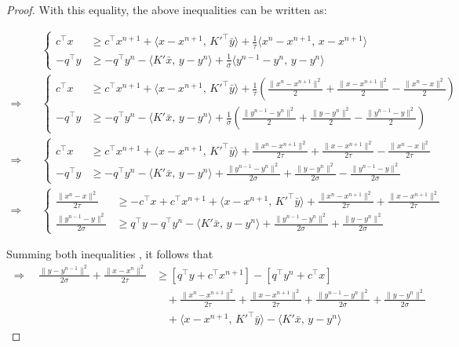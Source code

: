 \documentclass[10pt,a4paper]{amsart}
\begin{document}
\begin{proof}
    With this equality, the above inequalities can be written as:

\begin{align*}
&\left\{
\begin{aligned}
c^\top x &\geq c^\top x^{n+1} + \langle x - x^{n+1},\, K'^\top \bar{y} \rangle + \frac{1}{\tau} \langle x^n - x^{n+1},\, x - x^{n+1} \rangle \\
-q^\top y &\geq -q^\top y^{n} - \langle K' \bar{x},\, y - y^{n} \rangle + \frac{1}{\sigma} \langle y^{n-1} - y^{n},\, y - y^{n} \rangle
\end{aligned}
\right. \\[2ex]
%
\Rightarrow\quad
&\left\{
\begin{aligned}
c^\top x &\geq c^\top x^{n+1} + \langle x - x^{n+1},\, K'^\top \bar{y} \rangle 
+ \frac{1}{\tau} \left( \frac{\|x^n - x^{n+1}\|^2}{2} + \frac{\|x - x^{n+1}\|^2}{2} - \frac{\|x^n - x\|^2}{2} \right) \\
-q^\top y &\geq -q^\top y^{n} - \langle K' \bar{x},\, y - y^{n} \rangle 
+ \frac{1}{\sigma} \left( \frac{\|y^{n-1} - y^{n}\|^2}{2} + \frac{\|y - y^{n}\|^2}{2} - \frac{\|y^{n-1} - y\|^2}{2} \right)
\end{aligned}
\right. \\[2ex]
%
\Rightarrow\quad
&\left\{
\begin{aligned}
c^\top x &\geq c^\top x^{n+1} + \langle x - x^{n+1},\, K'^\top \bar{y} \rangle 
+ \frac{\|x^n - x^{n+1}\|^2}{2\tau} + \frac{\|x - x^{n+1}\|^2}{2\tau} - \frac{\|x^n - x\|^2}{2\tau} \\
-q^\top y &\geq -q^\top y^{n} - \langle K' \bar{x},\, y - y^{n} \rangle 
+ \frac{\|y^{n-1} - y^{n}\|^2}{2\sigma} + \frac{\|y - y^{n}\|^2}{2\sigma} - \frac{\|y^{n-1} - y\|^2}{2\sigma}
\end{aligned}
\right. \\[2ex]
%
\Rightarrow\quad
&\left\{
\begin{aligned}
\frac{\|x^n - x\|^2}{2\tau} &\geq -c^\top x + c^\top x^{n+1} + \langle x - x^{n+1},\, K'^\top \bar{y} \rangle 
+ \frac{\|x^n - x^{n+1}\|^2}{2\tau} + \frac{\|x - x^{n+1}\|^2}{2\tau} \\
\frac{\|y^{n-1} - y\|^2}{2\sigma} &\geq q^\top y - q^\top y^{n} - \langle K' \bar{x},\, y - y^{n} \rangle 
+ \frac{\|y^{n-1} - y^{n}\|^2}{2\sigma} + \frac{\|y - y^{n}\|^2}{2\sigma}
\end{aligned}
\right.
\end{align*}

    Summing both inequalities , it follows that 
\[
\begin{aligned}
\Rightarrow \quad
 \frac{\|y - y^{n-1}\|^2}{2\sigma} + \frac{\|x - x^n\|^2}{2\tau} &\geq [q^\top y + c^\top x^{n+1}] - [q^\top y^{n} + c^\top x] \\
& \quad + \frac{\|x^n - x^{n+1}\|^2}{2\tau} + \frac{\|x - x^{n+1}\|^2}{2\tau} + \frac{\|y^{n-1} - y^{n}\|^2}{2\sigma} + \frac{\|y - y^{n}\|^2}{2\sigma} \\
& \quad + \langle x - x^{n+1},\, K'^\top \bar{y} \rangle - \langle K' \bar{x},\, y - y^{n} \rangle
\end{aligned}
\]


\end{proof}
\end{document}
